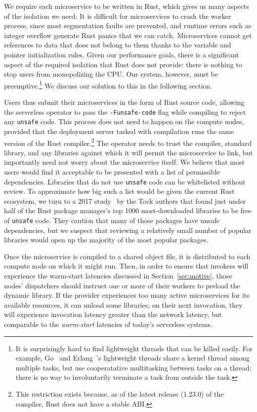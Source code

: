 We require each microservice to be written in Rust, which gives us many aspects of
the isolation we need:  It is difficult for microservices to crash the worker process,
since most segmentation faults are prevented, and runtime errors such as integer
overflow generate Rust panics that we can catch.  Microservices cannot get references
to data that does not belong to them thanks to the variable and pointer initialization
rules.  
Given our performance goals, there is a significant aspect of the
required isolation that Rust does not provide: there is nothing to stop users from
monopolizing the CPU\@.
Our system, however, must be preemptive.\footnote{It is surprisingly hard to find lightweight
  threads that can be killed easily.  For example, 
Go~\cite{www-golang} and Erlang~\cite{www-erlang}'s lightweight threads
share a kernel thread among multiple tasks, but use cooperatative multitasking
between tasks on a thread;  there is no way to involuntarily terminate a task
from outside the task.}  We discuss our solution to this in the following
section.

Users thus submit their microservices in the form of Rust source code, allowing the
serverless operator to pass the \texttt{-Funsafe-code} flag while compiling to reject
any \texttt{unsafe} code.  This process does not need to happen on the compute
nodes, provided that the deployment server tasked with compilation runs the same version
of the Rust compiler.\footnote{This restriction exists because, as of the latest
release (1.23.0) of the compiler, Rust does not have a stable ABI.}  The operator
needs to trust the compiler, standard library, and any libraries against which it
will permit the microservice to link, but importantly need not worry about the
microservice itself.  We believe that most users would find it acceptable to be
presented with a list of permissible dependencies.  Libraries that do not use
\texttt{unsafe} code can be whitelisted without review.  To approximate how big
such a list would be given the current Rust ecosystem, we turn to a 2017
study~\cite{www-cratesio-unsafe} by the Tock authors that found just under half of
the Rust package manager's top 1000 most-downloaded libraries to be free of
\texttt{unsafe} code.  They caution that many of those packages have unsafe
dependencies, but we suspect that reviewing a relatively small number of popular
libraries would open up the majority of the most popular packages.

Once the microservice is compiled to a shared object file, it is distributed to
each compute node on which it might run.  Then, in order to ensure that invokers will
experience the warm-start latencies discussed in Section~\ref{sec:motive}, those
nodes' dispatchers should instruct one or more of their workers to preload the
dynamic library.  If the provider experiences too many active
microservices for its available resources, it can unload some libraries; on their
next invocation, they will experience invocation latency greater than the network
latency, but comparable to the \textit{warm-start} latencies of today's serverless
systems.
